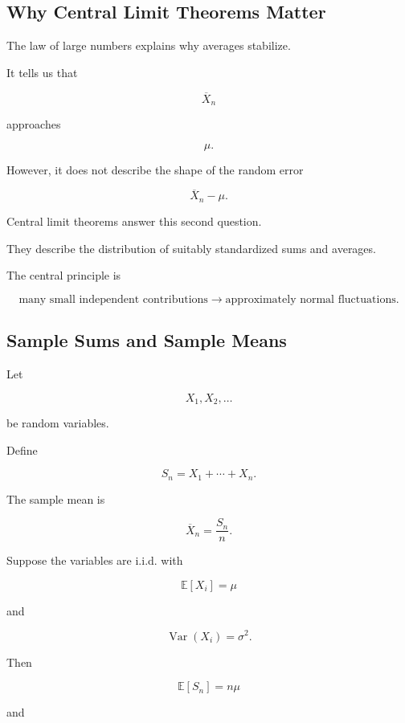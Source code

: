 \subsection{Why Central Limit Theorems Matter}
\label{subsec:why-central-limit-theorems}

The law of large numbers explains why averages stabilize.

It tells us that

\[
\overline{X}_n
\]

approaches

\[
\mu.
\]

However, it does not describe the shape of the random error

\[
\overline{X}_n-\mu.
\]

Central limit theorems answer this second question.

They describe the distribution of suitably standardized sums and
averages.

The central principle is

\[
\boxed{
\text{many small independent contributions}
\longrightarrow
\text{approximately normal fluctuations}.
}
\]

\subsection{Sample Sums and Sample Means}
\label{subsec:clt-sample-sums-means}

Let

\[
X_1,X_2,\ldots
\]

be random variables.

Define

\[
\boxed{
S_n
=
X_1+\cdots+X_n.
}
\]

The sample mean is

\[
\boxed{
\overline{X}_n
=
\frac{S_n}{n}.
}
\]

Suppose the variables are i.i.d. with

\[
\mathbb{E}[X_i]=\mu
\]

and

\[
\operatorname{Var}(X_i)=\sigma^2.
\]

Then

\[
\boxed{
\mathbb{E}[S_n]
=
n\mu
}
\]

and

